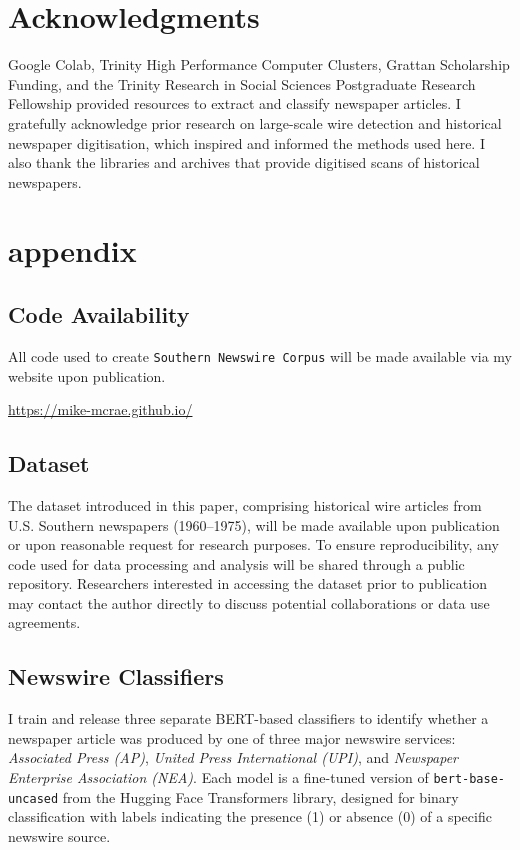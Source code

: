 \documentclass{article}
\begin{document}
\section*{Acknowledgments}
Google Colab, Trinity High Performance Computer Clusters, Grattan Scholarship Funding, and the Trinity Research in Social Sciences Postgraduate Research Fellowship provided resources to extract and classify newspaper articles. I gratefully acknowledge prior research on large-scale wire detection and historical newspaper digitisation, which inspired and informed the methods used here. I also thank the libraries and archives that provide digitised scans of historical newspapers. 





\section{appendix}
\subsection{Code Availability}
All code used to create \texttt{Southern Newswire Corpus} will be made available via my website upon  publication. 

\begin{center}
\url{https://mike-mcrae.github.io/}
\end{center}

\subsection{Dataset}
The dataset introduced in this paper, comprising historical wire articles from U.S. Southern newspapers (1960–1975), will be made available upon publication or upon reasonable request for research purposes. To ensure reproducibility, any code used for data processing and analysis will be shared through a public repository. Researchers interested in accessing the dataset prior to publication may contact the author directly to discuss potential collaborations or data use agreements.

\subsection{Newswire Classifiers}

I train and release three separate BERT-based classifiers to identify whether a newspaper article was produced by one of three major newswire services: \textit{Associated Press (AP)}, \textit{United Press International (UPI)}, and \textit{Newspaper Enterprise Association (NEA)}. Each model is a fine-tuned version of \texttt{bert-base-uncased} from the Hugging Face Transformers library, designed for binary classification with labels indicating the presence (1) or absence (0) of a specific newswire source. 
\end{document}
